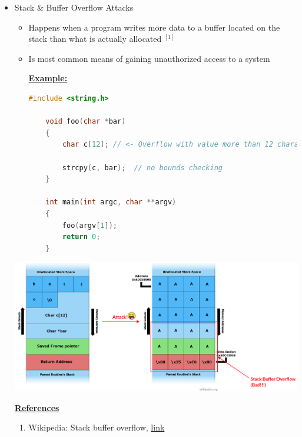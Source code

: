 \documentclass[12pt]{article}
\begin{document}
\begin{itemize}
    \item Stack \& Buffer Overflow Attacks
    \begin{itemize}
        \item Happens when a program writes more data to a buffer located on the
        stack than what is actually allocated $^{[1]}$
        \item Is most common means of gaining unauthorized access to a system

        \bigskip

        \underline{\textbf{Example:}}

        \bigskip

    \begin{lstlisting}[language=c]
    #include <string.h>

    void foo(char *bar)
    {
        char c[12]; // <- Overflow with value more than 12 characters in length

        strcpy(c, bar);  // no bounds checking
    }

    int main(int argc, char **argv)
    {
        foo(argv[1]);
        return 0;
    }
    \end{lstlisting}

    \bigskip

    \end{itemize}

    \begin{center}
        \includegraphics[width=\linewidth]{../images/week_11_notes_1_5.png}
    \end{center}

    \bigskip

    \underline{\textbf{References}}

    \bigskip

    \begin{enumerate}[1)]
        \item Wikipedia: Stack buffer overflow, \href{https://en.wikipedia.org/wiki/Stack_buffer_overflow}{link}
    \end{enumerate}


\end{itemize}
\end{document}
